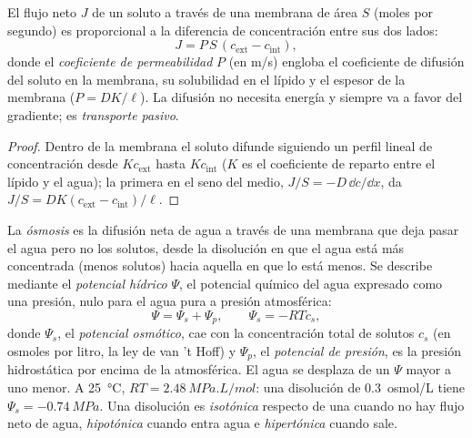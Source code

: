 \begin{theorem}\label{thm:b1:membranes-transport:fick}
El flujo neto $J$ de un soluto a través de una membrana de área $S$ (moles
por segundo) es proporcional a la diferencia de concentración entre sus dos
lados:
\[
J = P\,S\,(c_{\text{ext}} - c_{\text{int}}),
\]
donde el \emph{coeficiente de permeabilidad} $P$ (en \unit{m/s}) engloba el
coeficiente de difusión del soluto en la membrana, su solubilidad en el
lípido y el espesor de la membrana ($P = DK/\ell$). La difusión no necesita
energía y siempre va a favor del gradiente; es \emph{transporte
pasivo}.
\end{theorem}
\begin{proof}
Dentro de la membrana el soluto difunde siguiendo un perfil lineal de
concentración desde $Kc_{\text{ext}}$ hasta $Kc_{\text{int}}$ ($K$ es el
coeficiente de reparto entre el lípido y el agua); la primera  en
el seno del medio, $J/S = -D\,\dd c/\dd x$, da
$J/S = DK(c_{\text{ext}} -
c_{\text{int}})/\ell$.
\end{proof}

\begin{definition}\label{def:b1:membranes-transport:osmosis}
La \emph{ósmosis} es la difusión neta de agua a través de una
membrana que deja pasar el agua pero no los solutos, desde la disolución en
que el agua está más concentrada (menos solutos) hacia aquella en que lo
está menos. Se describe mediante el \emph{potencial
hídrico} $\Psi$, el potencial químico del agua
expresado como una presión, nulo para el agua pura a presión atmosférica:
\[
\Psi = \Psi_s + \Psi_p, \qquad \Psi_s = -RTc_s ,
\]
donde $\Psi_s$, el \emph{potencial osmótico}, cae
con la concentración total de solutos $c_s$ (en osmoles por litro, la ley de
van 't Hoff) y $\Psi_p$, el \emph{potencial de
presión}, es la presión hidrostática por encima
de la atmosférica. El agua se desplaza de un $\Psi$ mayor a uno menor. A
\qty{25}{\celsius}, $RT = \qty{2.48}{MPa.L/mol}$: una disolución de
\qty{0.3}{osmol/L} tiene $\Psi_s = \qty{-0.74}{MPa}$. Una disolución es
\emph{isotónica} respecto de una  cuando no hay flujo
neto de agua, \emph{hipotónica} cuando entra agua e \emph{hipertónica}
cuando sale.
\end{definition}

